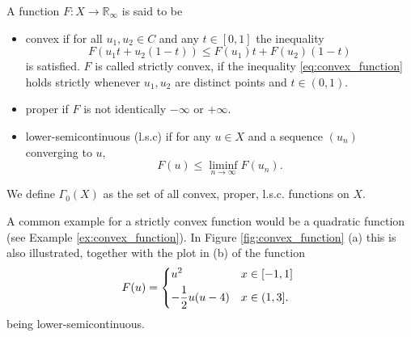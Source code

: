     \begin{definition} %
    \label{def:convex_function_proper_lower_semicontinuous}

        A function $F: X \longrightarrow \mathbb{R}_{\infty}$ is said to be
            \begin{itemize}
                \item convex if for all $u_{1}, u_{2} \in C$ and any $t \in [0, 1]$ the inequality
                \begin{equation}
                    F(u_{1}t + u_{2}(1 - t)) \le F(u_{1})t + F(u_{2})(1 - t)
                    \label{eq:convex_function}
                \end{equation}
                is satisfied. $F$ is called strictly convex, if the inequality \ref{eq:convex_function} holds strictly whenever $u_{1}, u_{2}$ are distinct points and $t \in (0, 1)$.
                \item proper if $F$ is not identically $-\infty$ or $+\infty$.
                \item lower-semicontinuous (l.s.c) if for any $u \in X$ and a sequence $(u_{n})$ converging to $u$,
                    \begin{equation}
                        F(u) \le \liminf_{n \rightarrow \infty} F(u_{n}).
                        \label{eq:lower_semicontinuous}
                    \end{equation}
            \end{itemize}
        We define $\Gamma_{0}(X)$ as the set of all convex, proper, l.s.c. functions on $X$.

    \end{definition}

    A common example for a strictly convex function would be a quadratic function (see Example \ref{ex:convex_function}). In Figure \ref{fig:convex_function} (a) this is also illustrated, together with the plot in (b) of the function
        \begin{equation}
            F(u) =
                \begin{dcases*}
                    u^{2} & \textnormal{$x \in [-1, 1]$} \\
                    - \frac{1}{2} u(u - 4) & \textnormal{$x \in (1, 3]$}.
                \end{dcases*}
            \label{eq:lsc_example}
        \end{equation}
    being lower-semicontinuous.

